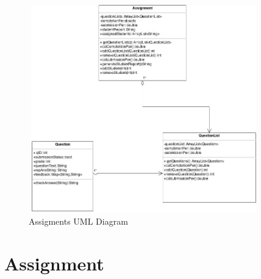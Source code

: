     \begin{figure}[H]
            \centerline{\includegraphics[height=9cm, width=10cm]{Assignment.jpg}}
            \caption{Assigments UML Diagram}
    \end{figure}




\chapter{Assignment}

